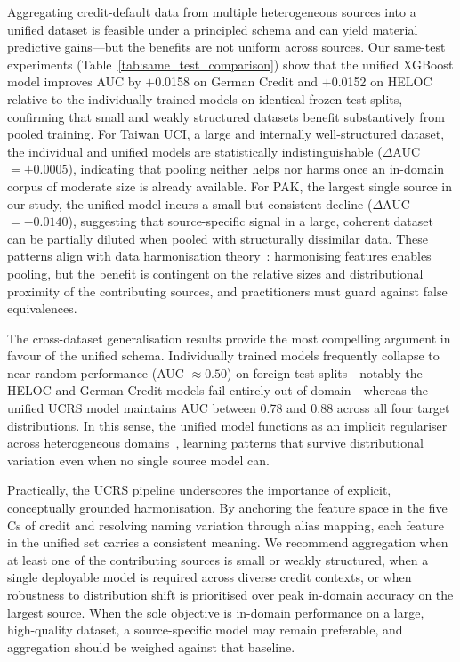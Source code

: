 \documentclass[onecolumn]{IEEEtai}
\begin{document}
Aggregating credit-default data from multiple heterogeneous sources into a unified dataset is feasible under a principled schema and can yield material predictive gains---but the benefits are not uniform across sources. Our same-test experiments (Table~\ref{tab:same_test_comparison}) show that the unified XGBoost model improves AUC by $+$0.0158 on German Credit and $+$0.0152 on HELOC relative to the individually trained models on identical frozen test splits, confirming that small and weakly structured datasets benefit substantively from pooled training. For Taiwan UCI, a large and internally well-structured dataset, the individual and unified models are statistically indistinguishable ($\Delta$AUC $= +0.0005$), indicating that pooling neither helps nor harms once an in-domain corpus of moderate size is already available. For PAK, the largest single source in our study, the unified model incurs a small but consistent decline ($\Delta$AUC $= -0.0140$), suggesting that source-specific signal in a large, coherent dataset can be partially diluted when pooled with structurally dissimilar data. These patterns align with data harmonisation theory~\cite{8,16,20}: harmonising features enables pooling, but the benefit is contingent on the relative sizes and distributional proximity of the contributing sources, and practitioners must guard against false equivalences.

The cross-dataset generalisation results provide the most compelling argument in favour of the unified schema. Individually trained models frequently collapse to near-random performance (AUC $\approx 0.50$) on foreign test splits---notably the HELOC and German Credit models fail entirely out of domain---whereas the unified UCRS model maintains AUC between 0.78 and 0.88 across all four target distributions. In this sense, the unified model functions as an implicit regulariser across heterogeneous domains~\cite{1,2,7,12,24}, learning patterns that survive distributional variation even when no single source model can.

Practically, the UCRS pipeline underscores the importance of explicit, conceptually grounded harmonisation. By anchoring the feature space in the five Cs of credit and resolving naming variation through alias mapping, each feature in the unified set carries a consistent meaning. We recommend aggregation when at least one of the contributing sources is small or weakly structured, when a single deployable model is required across diverse credit contexts, or when robustness to distribution shift is prioritised over peak in-domain accuracy on the largest source. When the sole objective is in-domain performance on a large, high-quality dataset, a source-specific model may remain preferable, and aggregation should be weighed against that baseline.
\end{document}
